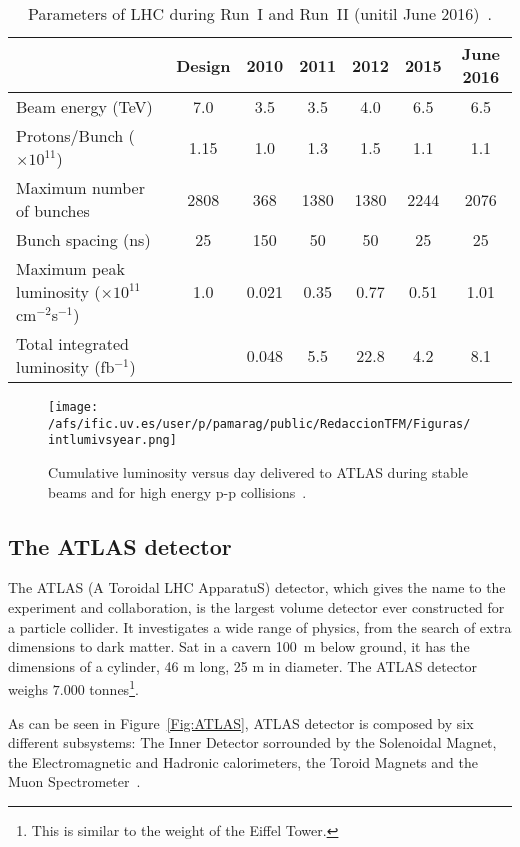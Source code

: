 \begin{table}
\begin{tabular}{|l | c c c c c c|}
\hline
                 & Design & 2010 & 2011 & 2012 & 2015 & June 2016 \\ \hline
Beam energy (TeV) & 7.0 & 3.5 & 3.5 & 4.0 & 6.5 & 6.5 \\ \hline
Protons/Bunch ($\times 10^{11}$) & 1.15 & 1.0 & 1.3& 1.5&1.1&1.1 \\ \hline
Maximum number of bunches & 2808 & 368  & 1380  & 1380 & 2244 & 2076\\ \hline
Bunch spacing (ns) & 25 & 150 & 50 & 50 & 25 & 25 \\ \hline
Maximum peak luminosity ($\times 10^{11}$ cm$^{-2}$s$^{-1}$) & 1.0 &0.021&0.35&0.77&0.51&1.01\\ \hline
Total integrated luminosity (fb$^{-1}$) & &0.048&5.5&22.8&4.2&8.1\\ \hline
\end{tabular} 
\caption{Parameters of LHC during Run~I and Run~II (unitil June 2016)~\cite{bruce2016lhc}.}
\label{table:LHCParameters}
\end{table}


  
\begin{figure}[htb]
\centering
\texttt{[image: /afs/ific.uv.es/user/p/pamarag/public/RedaccionTFM/Figuras/intlumivsyear.png]}
\caption{Cumulative luminosity versus day delivered to ATLAS during stable beams and for high energy p-p collisions~\cite{Web:Luminosity}.}
\label{Fig:Lumi}
\end{figure}




\subsection{The ATLAS detector} \label{subsec:ATLAS}
The ATLAS (A Toroidal LHC ApparatuS) detector, which gives the name to the experiment and collaboration, is the largest volume detector ever constructed for a particle collider. It investigates a wide range of physics, from the search of extra dimensions to dark matter. Sat in a cavern 100~m below ground, it has the dimensions of a cylinder, 46 m long, 25 m in diameter. The ATLAS detector weighs $7.000$ tonnes\footnote{This is similar to the weight of the Eiffel Tower.}.

As can be seen in Figure~\ref{Fig:ATLAS}, ATLAS detector is composed by six different subsystems: The Inner Detector sorrounded by the Solenoidal Magnet, the Electromagnetic and Hadronic calorimeters, the Toroid Magnets and the Muon Spectrometer~\cite{ATLAS:1999uwa}.

